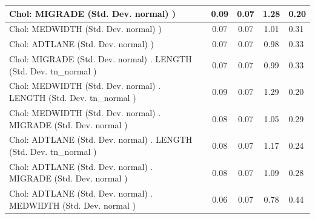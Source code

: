 \begin{table}
\begin{center}
\begin{tabular}{|l|l|c|c|c|l|}
			\hline
			 Chol: MIGRADE (Std. Dev. normal) ) &  & 0.09 & 0.07 & 1.28 & 0.20 \\
			\hline
			 Chol: MEDWIDTH (Std. Dev. normal) ) &  & 0.07 & 0.07 & 1.01 & 0.31 \\
			\hline
			 Chol: ADTLANE (Std. Dev. normal) ) &  & 0.07 & 0.07 & 0.98 & 0.33 \\
			\hline
			 Chol: MIGRADE (Std. Dev. normal) . LENGTH (Std. Dev.   tn_normal ) &  & 0.07 & 0.07 & 0.99 & 0.33 \\
			\hline
			 Chol: MEDWIDTH (Std. Dev. normal) . LENGTH (Std. Dev.   tn_normal ) &  & 0.09 & 0.07 & 1.29 & 0.20 \\
			\hline
			 Chol: MEDWIDTH (Std. Dev. normal) . MIGRADE (Std. Dev.   normal ) &  & 0.08 & 0.07 & 1.05 & 0.29 \\
			\hline
			 Chol: ADTLANE (Std. Dev. normal) . LENGTH (Std. Dev.   tn_normal ) &  & 0.08 & 0.07 & 1.17 & 0.24 \\
			\hline
			 Chol: ADTLANE (Std. Dev. normal) . MIGRADE (Std. Dev.   normal ) &  & 0.08 & 0.07 & 1.09 & 0.28 \\
			\hline
			 Chol: ADTLANE (Std. Dev. normal) . MEDWIDTH (Std. Dev.   normal ) &  & 0.06 & 0.07 & 0.78 & 0.44 \\
			\hline
		\end{tabular}
	\end{center}
\end{table}